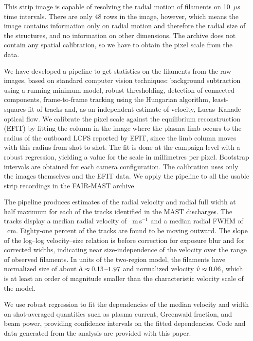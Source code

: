 This strip image is capable of resolving the radial motion of filaments on 10~$\mu$s time intervals. There are only 48 rows in the image, however, which means the image contains information only on radial motion and therefore the radial size of the structures, and no information on other dimensions. The archive does not contain any spatial calibration, so we have to obtain the pixel scale from the data.

We have developed a pipeline to get statistics on the filaments from the raw images, based on standard computer vision techniques: background subtraction using a running minimum model, robust thresholding, detection of connected components, frame-to-frame tracking using the Hungarian algorithm, least-squares fit of tracks and, as an independent estimate of velocity, Lucas--Kanade optical flow. We calibrate the pixel scale against the equilibrium reconstruction (EFIT) by fitting the column in the image where the plasma limb occurs to the radius of the outboard LCFS reported by EFIT, since the limb column moves with this radius from shot to shot. The fit is done at the campaign level with a robust regression, yielding a value for the scale in millimetres per pixel. Bootstrap intervals are obtained for each camera configuration. The calibration uses only the images themselves and the EFIT data. We apply the pipeline to all the usable strip recordings in the FAIR-MAST archive.

The pipeline produces estimates of the radial velocity and radial full width at half maximum for each of the \nTracksSel{} tracks identified in the \nShotsStats{} MAST discharges. The tracks display a median radial velocity of \vMedAll{}~m\,s$^{-1}$ and a median radial FWHM of \dMedAll{}~cm. Eighty-one percent of the tracks are found to be moving outward. The slope of the log--log velocity--size relation is \vdSlopePooled{} before correction for exposure blur and \vdSlopePooledBlur{} for corrected widths, indicating near size-independence of the velocity over the range of observed filaments. In units of the two-region model, the filaments have normalized size of about $\hat a \approx 0.13$--$1.97$ and normalized velocity $\hat v \approx 0.06$, which is at least an order of magnitude smaller than the characteristic velocity scale of the model.

We use robust regression to fit the dependencies of the median velocity and width on shot-averaged quantities such as plasma current, Greenwald fraction, and beam power, providing confidence intervals on the fitted dependencies. Code and data generated from the analysis are provided with this paper.
